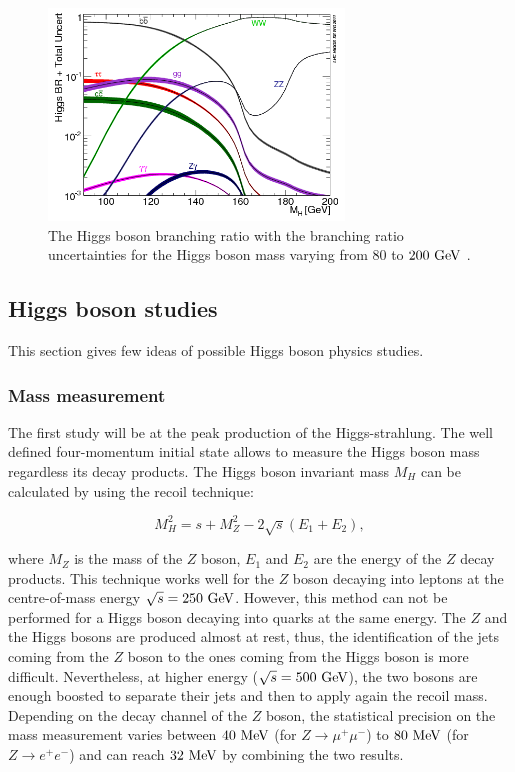     \begin{figure}[!h]
      \centering
      \includegraphics[width = 0.7\textwidth]{Pictures/Higgs/BRTotalUncertBands_lm.png}
      \caption{The Higgs boson branching ratio with the branching ratio uncertainties for the Higgs boson mass varying from $80$ to $200~\rm{GeV}$ \cite{Denner:2011mq}.}
      \label{fig:higgsProd}
    \end{figure}

    \subsection{Higgs boson studies}

    This section gives few ideas of possible Higgs boson physics studies.

    \subsubsection{Mass measurement}

    The first study will be at the peak production of the Higgs-strahlung. 
    The well defined four-momentum initial state allows to measure the Higgs boson mass regardless its decay products.
    The Higgs boson invariant mass $M_H$ can be calculated by using the recoil technique:

    \begin{equation}
      M^2_H = s + M^2_Z - 2 \sqrt{s}\left(E_{1} + E_{2}\right),
    \end{equation}

    where $M_Z$ is the mass of the $Z$ boson, $E_1$ and $E_2$ are the energy of the $Z$ decay products. 
    This technique works well for the $Z$ boson decaying into leptons at the centre-of-mass energy $\sqrt{s} = 250~\rm{GeV}$.
    However, this method can not be performed for a Higgs boson decaying into quarks at the same energy. 
    The $Z$ and the Higgs bosons are produced almost at rest, thus, the identification of the jets coming from the $Z$ boson to the ones coming from the Higgs boson is more difficult.
    Nevertheless, at higher energy ($\sqrt{s} = 500~\rm{GeV}$), the two bosons are enough boosted to separate their jets and then to apply again the recoil mass.
    Depending on the decay channel of the $Z$ boson, the statistical precision on the mass measurement varies between $40~\rm{MeV}$ (for $Z \rightarrow \mu^+\mu^-$) to $80~\rm{MeV}$ (for $Z \rightarrow e^+e^-$) and can reach $32~\rm{MeV}$ by combining the two results.

